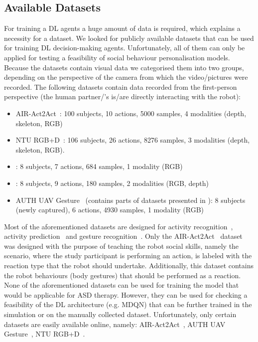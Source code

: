 \documentclass[thesis]{mas_proposal}
\begin{document}
\subsection{Available Datasets}
 For training a DL agents a huge amount of data is required, which explains a necessity for a dataset. We looked for publicly available datasets that can be used for training DL decision-making agents. Unfortunately, all of them can only be applied for testing a feasibility of social behaviour personalisation models. Because the datasets contain visual data we categorised them into two groups, depending on the perspective of the camera from which the video/pictures were recorded. The following datasets contain data recorded from the first-person perspective (the human partner/'s is/are directly interacting with the robot):
\begin{itemize}
	\item AIR-Act2Act~\cite{Ko2021}: 100 subjects, 10 actions, 5000 samples, 4 modalities (depth, skeleton, RGB)
	\item NTU RGB+D~\cite{Shahroudy_2016_CVPR,Liu2020}: 106 subjects, 26 actions, 8276 samples, 3 modalities (depth, skeleton, RGB).
	\item \cite{ryoo2013firstperson}: 8 subjects, 7 actions, 684 samples, 1 modality (RGB) 
	\item \cite{ryoo2015robot}: 8 subjects, 9 actions, 180 samples, 2 modalities (RGB, depth)
	\item AUTH UAV Gesture~\cite{patrona2021overview} (contains parts of datasets presented in \cite{Shahroudy_2016_CVPR,Perera_2018_ECCV_Workshops}): 8 subjects (newly captured), 6 actions, 4930 samples, 1 modality (RGB) 
\end{itemize}

Most of the aforementioned datasets are designed for activity recognition~\cite{Shahroudy_2016_CVPR,Liu2020,ryoo2013firstperson}, activity prediction~\cite{ryoo2015robot} and gesture recognition~\cite{patrona2021overview}. Only the AIR-Act2Act~\cite{Ko2021} dataset was designed with the purpose of teaching the robot social skills, namely the scenario, where the study participant is performing an action, is labeled with the reaction type that the robot should undertake. Additionally, this dataset contains the robot behaviours (body gestures) that should be performed as a reaction. None of the aforementioned datasets can be used for training the model that would be applicable for ASD therapy. However, they can be used for checking a feasibility of the DL architecture (e.g. MDQN) that can be further trained in the simulation or on the manually collected dataset. Unfortunately, only certain datasets are easily available online, namely: AIR-Act2Act~\cite{Ko2021}, AUTH UAV Gesture~\cite{patrona2021overview}, NTU RGB+D~\cite{Shahroudy_2016_CVPR,Liu2020}.
\end{document}
